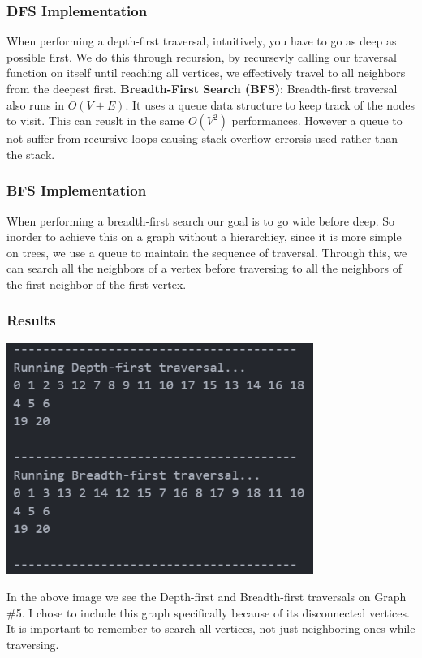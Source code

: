 \documentclass[12pt, letterpaper]{article}
\begin{document}
\subsubsection{DFS Implementation}
\begin{center}
   
\end{center}
When performing a depth-first traversal, intuitively, you have to go as deep as possible first.
We do this through recursion, by recursevly calling our traversal function on itself until reaching all vertices, we effectively travel to all neighbors from the deepest first.
\vspace*{5px}
\newline
\textbf{Breadth-First Search (BFS)}:
\newline
Breadth-first traversal also runs in $O(V + E)$.
It uses a queue data structure to keep track of the nodes to visit.
This can reuslt in the same $O(V^2)$ performances. 
However a queue to not suffer from recursive loops causing stack overflow errorsis used rather than the stack.
\subsubsection{BFS Implementation}
\begin{center}
   
\end{center}
When performing a breadth-first search our goal is to go wide before deep.
So inorder to achieve this on a graph without a hierarchiey, since it is more simple on trees, we use a queue to maintain the sequence of traversal.
Through this, we can search all the neighbors of a vertex before traversing to all the neighbors of the first neighbor of the first vertex.
\subsubsection{Results}
\begin{center}
   \includegraphics[width=100mm, scale=0.5]{Images/Graph5_Traversals.png}
\end{center}
In the above image we see the Depth-first and Breadth-first traversals on Graph \#5.
I chose to include this graph specifically because of its disconnected vertices.
It is important to remember to search all vertices, not just neighboring ones while traversing.
\end{document}
